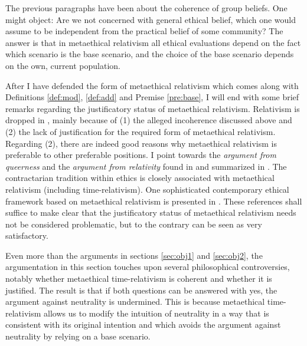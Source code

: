 The previous paragraphs have been about the coherence of group beliefs. One might object: Are we not concerned with general ethical belief, which one would assume to be independent from the practical belief of some community? The answer is that in metaethical relativism all ethical evaluations depend on the fact which scenario is the base scenario, and the choice of the base scenario depends on the own, current population. 

After I have defended the form of metaethical relativism which comes along with Definitions \ref{def:mod}, \ref{def:add} and Premise \ref{pre:base}, I will end with some brief remarks regarding the justificatory status of metaethical relativism. Relativism is dropped in , mainly because of (1) the alleged incoherence discussed above and (2) the lack of justification for the required form of metaethical relativism. Regarding (2), there are indeed good reasons why metaethical relativism is preferable to other preferable positions. I point towards the \emph{argument from queerness} and the \emph{argument from relativity} found in  and summarized in . The contractarian tradition within ethics is closely associated with metaethical relativism (including time-relativism). One sophisticated contemporary ethical framework based on metaethical relativism is presented in . These references shall suffice to make clear that the justificatory status of metaethical relativism needs not be considered problematic, but to the contrary can be seen as very satisfactory. 

Even more than the arguments in sections \ref{sec:obj1} and \ref{sec:obj2}, the argumentation in this section touches upon several philosophical controversies, notably whether metaethical time-relativism is coherent and whether it is justified. The result is that if both questions can be answered with yes, the argument against neutrality is undermined. This is because metaethical time-relativism allows us to modify the intuition of neutrality in a way that is consistent with its original intention and which avoids the argument against neutrality by relying on a base scenario. 